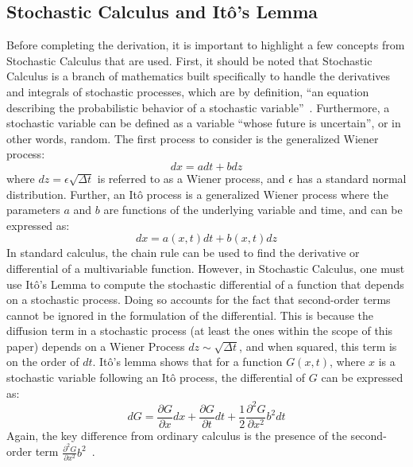 \documentclass[12pt, onecolumn, journal]{IEEEtran}
\begin{document}
\subsection{Stochastic Calculus and It\^{o}'s Lemma}
Before completing the derivation, it is important to highlight a few concepts from Stochastic Calculus that are used. First, it should be noted that Stochastic Calculus is a branch of mathematics built specifically to handle the derivatives and integrals of stochastic processes, which are by definition, ``an equation describing the probabilistic behavior of a stochastic variable''~\cite{Hull2022}. Furthermore, a stochastic variable can be defined as a variable ``whose future is uncertain'', or in other words, random. The first process to consider is the generalized Wiener process:
\begin{equation}
    dx = adt + bdz
\end{equation}
where $dz = \epsilon \sqrt{\Delta t}$ is referred to as a Wiener process, and $\epsilon$ has a standard normal distribution. Further, an It\^{o} process is a generalized Wiener process where the parameters $a$ and $b$ are functions of the underlying variable and time, and can be expressed as:
\begin{equation}
    dx = a(x, t)dt + b(x, t)dz
    \label{eq:ito_process}
\end{equation}
In standard calculus, the chain rule can be used to find the derivative or differential of a multivariable function. However, in Stochastic Calculus, one must use It\^{o}'s Lemma to compute the stochastic differential of a function that depends on a stochastic process. Doing so accounts for the fact that second-order terms cannot be ignored in the formulation of the differential. This is because the diffusion term in a stochastic process (at least the ones within the scope of this paper) depends on a Wiener Process $dz \sim \sqrt{\Delta t}$, and when squared, this term is on the order of $dt$.
It\^{o}'s lemma shows that for a function $G(x, t)$, where $x$ is a stochastic variable following an It\^{o} process, the differential of $G$ can be expressed as:
\begin{equation}
    dG = \frac{\partial G}{\partial x} dx + \frac{\partial G}{\partial t} dt + \frac{1}{2} \frac{\partial^2 G}{\partial x^2} b^2 dt
    \label{eq:ito_lemma}
\end{equation}
Again, the key difference from ordinary calculus is the presence of the second-order term $\frac{\partial^2 G}{\partial x^2} b^2$~\cite{Hull2022}.
\end{document}
